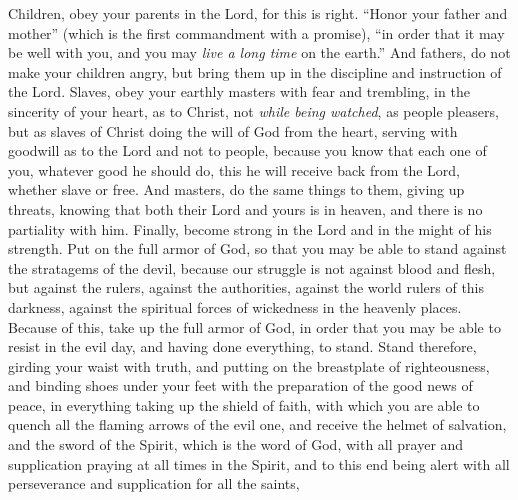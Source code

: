\begin{biblechapter} %
 Children, obey your parents in the Lord, for this is right.
\verse “Honor your father and mother” (which is the first commandment with a promise),
\verse “in order that it may be well with you, and you may \textit{live a long time} on the earth.”
\verse And fathers, do not make your children angry, but bring them up in the discipline and instruction of the Lord.
 Slaves, obey your earthly masters with fear and trembling, in the sincerity of your heart, as to Christ,
\verse not \textit{while being watched}, as people pleasers, but as slaves of Christ doing the will of God from the heart,
\verse serving with goodwill as to the Lord and not to people,
\verse because you know that each one of you, whatever good he should do, this he will receive back from the Lord, whether slave or free.
\verse And masters, do the same things to them, giving up threats, knowing that both their Lord and yours is in heaven, and there is no partiality with him.
 Finally, become strong in the Lord and in the might of his strength.
\verse Put on the full armor of God, so that you may be able to stand against the stratagems of the devil,
\verse because our struggle is not against blood and flesh, but against the rulers, against the authorities, against the world rulers of this darkness, against the spiritual forces of wickedness in the heavenly places.
\verse Because of this, take up the full armor of God, in order that you may be able to resist in the evil day, and having done everything, to stand.
\verse Stand therefore, girding your waist with truth, and putting on the breastplate of righteousness,
\verse and binding shoes under your feet with the preparation of the good news of peace,
\verse in everything taking up the shield of faith, with which you are able to quench all the flaming arrows of the evil one,
\verse and receive the helmet of salvation, and the sword of the Spirit, which is the word of God,
\verse with all prayer and supplication praying at all times in the Spirit, and to this end being alert with all perseverance and supplication for all the saints,

\end{biblechapter}
